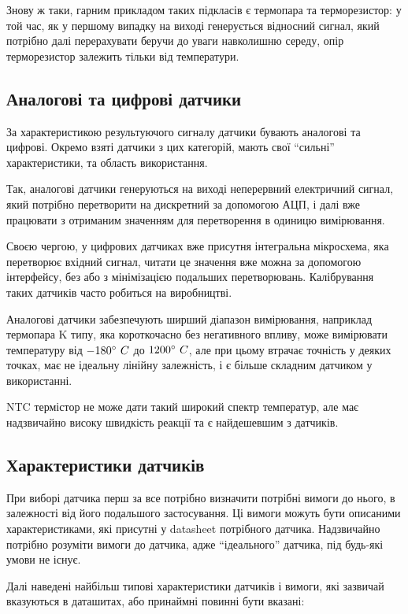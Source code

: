 Знову ж таки, гарним прикладом таких підкласів є термопара та терморезистор: у той час, як у першому випадку на виході генерується відносний сигнал, який потрібно далі перерахувати беручи до уваги навколишню середу, опір терморезистор залежить тільки від температури.\\

\subsection{Аналогові та цифрові датчики}

За характеристикою результуючого сигналу датчики бувають аналогові та цифрові. Окремо взяті датчики з цих категорій, мають свої ``сильні'' характеристики, та область використання.

Так, аналогові датчики генеруються на виході неперервний електричний сигнал, який потрібно перетворити на дискретний за допомогою АЦП, і далі вже працювати з отриманим значенням для перетворення в одиницю вимірювання.

Своєю чергою, у цифрових датчиках вже присутня інтегральна мікросхема, яка перетворює вхідний сигнал, читати це значення вже можна за допомогою інтерфейсу, без або з мінімізацією подальших перетворювань. Калібрування таких датчиків часто робиться на виробництві.

Аналогові датчики забезпечують ширший діапазон вимірювання, наприклад термопара K типу, яка короткочасно без негативного впливу, може вимірювати температуру від $\ignorespaces -180^\circ~C$ до $\ignorespaces 1200^\circ~C$, але при цьому втрачає точність у деяких точках, має не ідеальну лінійну залежність, і є більше складним датчиком у використанні.

NTC термістор не може дати такий широкий спектр температур, але має надзвичайно високу швидкість реакції та є найдешевшим з датчиків.\\

\subsection{Характеристики датчиків}

При виборі датчика перш за все потрібно визначити потрібні вимоги до нього, в залежності від його подальшого застосування. Ці вимоги можуть бути описаними характеристиками, які присутні у datasheet потрібного датчика. Надзвичайно потрібно розуміти вимоги до датчика, адже ``ідеального'' датчика, під будь-які умови не існує.

Далі наведені найбільш типові характеристики датчиків і вимоги, які зазвичай вказуються в даташитах, або принаймні повинні бути вказані:

